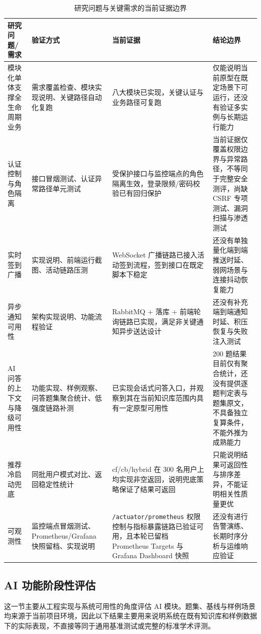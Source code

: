\begin{table}[H]
\centering
\small
\caption{研究问题与关键需求的当前证据边界}
\label{tab:rq-requirement-evidence}
\begin{tabular}{p{2.8cm}p{3.2cm}p{3.8cm}p{3.6cm}}
\toprule
研究问题/需求 & 验证方式 & 当前证据 & 结论边界 \\
\midrule
模块化单体支撑全生命周期业务 & 需求覆盖检查、模块实现说明、关键路径自动化复跑 & 八大模块已实现，关键认证与业务路径可复跑 & 仅能说明当前原型在既定场景下可运行，还没有验证多实例与长期运行能力 \\
认证控制与角色隔离 & 接口冒烟测试、认证异常路径单元测试 & 受保护接口与监控端点的角色隔离生效，登录限频/密码校验已有回归保护 & 当前证据仅覆盖权限边界与异常路径，不等同于完整安全测评，尚缺 CSRF 专项测试、漏洞扫描与渗透测试 \\
实时签到广播 & 实现说明、前端运行截图、活动链路压测 & WebSocket 广播链路已接入活动签到流程，签到接口在既定脚本下稳定 & 还没有单独量化端到端推送时延、弱网场景与连接抖动恢复能力 \\
异步通知可用性 & 架构实现说明、功能流程验证 & RabbitMQ + 落库 + 前端轮询链路已实现，满足非关键通知异步送达设计 & 还没有补充端到端通知时延、积压恢复与失败注入测试 \\
AI 问答的上下文与降级可用性 & 功能实现、样例观察、问答题集聚合统计、低强度链路补测 & 已实现会话式问答入口，并观察到其在当前知识库范围内具有一定原型可用性 & 200 题结果目前仅有聚合统计，还没有提供逐题判定表与题集原文，不具备独立复算条件，不能外推为成熟能力 \\
推荐冷启动兜底 & 同批用户模式对比、返回稳定性统计 & cf/cb/hybrid 在 300 名用户上均实现非空返回，说明兜底策略保证了结果可返回 & 只能说明结果可返回性与排序差异，不能证明相关性质量更优 \\
可观测性 & 监控端点冒烟测试、Prometheus/Grafana 快照留档、实现说明 & \texttt{/actuator/prometheus} 权限控制与指标暴露链路已验证可用，且本轮已留档 Prometheus Targets 与 Grafana Dashboard 快照 & 还没有进行告警演练、长期时序分析与运维响应验证 \\
\bottomrule
\end{tabular}
\end{table}

\subsection{AI 功能阶段性评估}

这一节主要从工程实现与系统可用性的角度评估 AI 模块。题集、基线与样例场景均来源于当前项目环境，因此以下结果主要用来说明系统在既有知识库和样例数据下的实际表现，不直接等同于通用基准测试或完整的标准学术评测。

